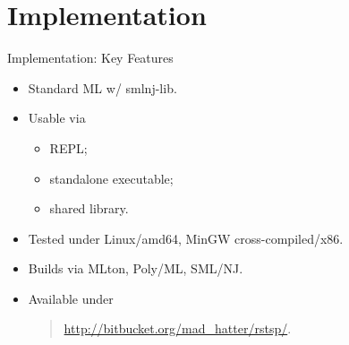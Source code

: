 \documentclass[
  size=10pt,
  style=klope,
  paper=screen,
  pauseslide,
  nopagebreaks,
  hlsections,
  fleqn
]{powerdot}
\begin{document}
\section[template=wideslide]{Implementation}

\begin{slide}[toc=Key Features]{Implementation: Key Features}
  \begin{itemize}
  \item
  Standard ML w/ smlnj-lib.
  \item
  Usable via
  \begin{itemize}
    \item REPL;
    \item standalone executable;
    \item shared library.
  \end{itemize}
  \item
  Tested under Linux/amd64, MinGW cross-compiled/x86.
  \item
  Builds via MLton, Poly/ML, SML/NJ.
  \item
  Available under
  \begin{quote}
    \hspace{3.4em} \url{http://bitbucket.org/mad_hatter/rstsp/}.
  \end{quote}
  \end{itemize}
\end{slide}
\end{document}

